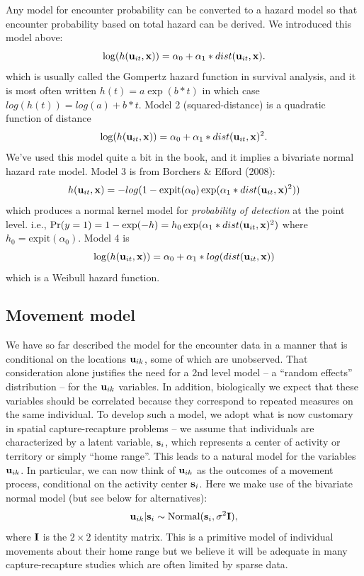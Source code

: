 Any model for encounter probability can be converted to a hazard model
so that encounter probability based on total hazard can be derived.
We introduced this model above:
\[
\log(h({\bf u}_{it},{\bf x})) = \alpha_{0} + \alpha_{1}*dist({\bf u}_{it},{\bf x}).
\]
which is usually called the Gompertz hazard function in survival
analysis, and it is most often written $h(t) = a \exp( b*t)$ in which
case $log(h(t)) = log(a) + b*t$.  Model 2 (squared-distance) is a
quadratic function of distance
\[
\log(h({\bf u}_{it},{\bf x})) = \alpha_{0} + \alpha_{1}*dist({\bf u}_{it},{\bf x})^2.
\]
We've used this model quite a bit in the book, and it implies a
bivariate normal hazard rate model. Model 3 is from Borchers \& Efford
(2008):
\[
h({\bf u}_{it},{\bf x} ) = -log(1 - \mbox{expit}(\alpha_{0})
\exp( \alpha_{1}*dist({\bf u}_{it},{\bf x})^2 ) )
\]
which produces a normal kernel model for {\it probability of
  detection} at the point level. i.e., $\Pr(y=1) = 1-\exp(-h) = h_{0}
\exp( \alpha_{1}*dist({\bf u}_{it},{\bf x})^2 )$ where $h_{0} =
\mbox{expit}(\alpha_{0})$.  Model 4 is
\[
\log(h({\bf u}_{it},{\bf x})) = \alpha_{0} + \alpha_{1}*log(dist({\bf u}_{it},{\bf x}))
\]
which is a Weibull hazard function.



\subsection{Movement model}

We have so far described the model for the encounter data in a manner
that is conditional on the locations ${\bf u}_{ik}$, some of which are
unobserved. That consideration alone justifies the need for a 2nd
level model -- a ``random effects'' distribution -- for the ${\bf
  u}_{ik}$ variables. In addition, biologically we expect that these
variables should be correlated because they correspond to repeated
measures on the same individual.  To develop such a model, we adopt
what is now customary in spatial capture-recapture problems -- we
assume that individuals are characterized by a latent variable, ${\bf
  s}_{i}$, which represents a center of activity or territory or
simply ``home range''. This leads to a natural model for the variables
${\bf u}_{ik}$. In particular, we can now think of ${\bf u}_{ik}$ as
the outcomes of a movement process, conditional on the activity center
${\bf  s}_{i}$. Here we make use of the bivariate normal model (but
see below for alternatives):
\[
 {\bf u}_{ik} | {\bf s}_{i} \sim \mbox{Normal}({\bf s}_{i}, \sigma^{2}{\bf I}),
\]
where ${\bf I}$ is the $2\times 2$ identity matrix.  This is a
primitive model of individual movements about their home range but we
believe it will be adequate in many capture-recapture studies which
are often limited by sparse data.

